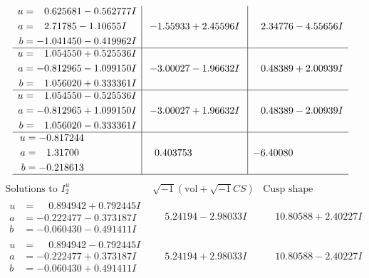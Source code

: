 \documentclass[1p]{elsarticle_modified}
\theoremstyle{definition}
\newcommand{\I}{\sqrt{-1}}
\begin{document}
$$\begin{array}{c|c|c}
\begin{aligned}
u &= \phantom{-}0.625681 - 0.562777 I \\
a &= \phantom{-}2.71785 - 1.10655 I \\
b &= -1.041450 - 0.419962 I\end{aligned}
 & -1.55933 + 2.45596 I & \phantom{-}2.34776 - 4.55656 I \\ \hline\begin{aligned}
u &= \phantom{-}1.054550 + 0.525536 I \\
a &= -0.812965 - 1.099150 I \\
b &= \phantom{-}1.056020 + 0.333361 I\end{aligned}
 & -3.00027 - 1.96632 I & \phantom{-}0.48389 + 2.00939 I \\ \hline\begin{aligned}
u &= \phantom{-}1.054550 - 0.525536 I \\
a &= -0.812965 + 1.099150 I \\
b &= \phantom{-}1.056020 - 0.333361 I\end{aligned}
 & -3.00027 + 1.96632 I & \phantom{-}0.48389 - 2.00939 I \\ \hline\begin{aligned}
u &= -0.817244\phantom{ +0.000000I} \\
a &= \phantom{-}1.31700\phantom{ +0.000000I} \\
b &= -0.218613\phantom{ +0.000000I}\end{aligned}
 & \phantom{-}0.403753\phantom{ +0.000000I} & -6.40080\phantom{ +0.000000I}\\
 \hline 
 \end{array}$$\newpage$$\begin{array}{c|c|c}  
\text{Solutions to }I^u_{2}& \I (\text{vol} + \sqrt{-1}CS) & \text{Cusp shape}\\
 \hline 
\begin{aligned}
u &= \phantom{-}0.894942 + 0.792445 I \\
a &= -0.222477 - 0.373187 I \\
b &= -0.060430 - 0.491411 I\end{aligned}
 & \phantom{-}5.24194 - 2.98033 I & \phantom{-}10.80588 + 2.40227 I \\ \hline\begin{aligned}
u &= \phantom{-}0.894942 - 0.792445 I \\
a &= -0.222477 + 0.373187 I \\
b &= -0.060430 + 0.491411 I\end{aligned}
 & \phantom{-}5.24194 + 2.98033 I & \phantom{-}10.80588 - 2.40227 I \\ \hline\begin{aligned}

\end{aligned}
\end{array}$$
\end{document}
